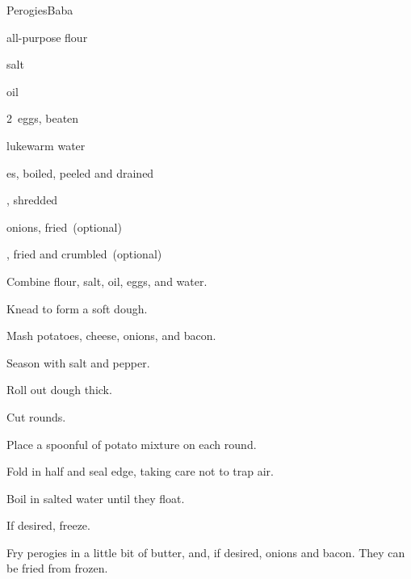 \begin{recipe}{Perogies}{Baba}{}

\begin{ingredients}
\item {} all-purpose flour
\item \tp{1\half} salt
\item {} oil
\item 2~eggs, beaten
\item \C{1\half} lukewarm water
\item \lbs{2\half} es, boiled, peeled and drained
\item \lbs{\half} , shredded
\item onions, fried~(optional)
\item {}, fried and crumbled~(optional)
\end{ingredients}

\begin{directions}
\item Combine flour, salt, oil, eggs, and water.
\item Knead to form a soft dough.
\item Mash potatoes, cheese, onions, and bacon.
\item Season with salt and pepper.
\item Roll out dough \inch{\eighth} thick.
\item Cut  rounds.
\item Place a spoonful of potato mixture on each round.
\item Fold in half and seal edge, taking care not to trap air.
\item Boil in salted water until they float.
\item If desired, freeze.
\item Fry perogies in a little bit of butter, and, if desired, onions and bacon. They can be fried from frozen.
\end{directions}

\end{recipe}
